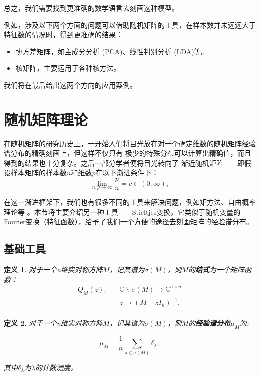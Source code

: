 \documentclass[UTF8,12pt]{ctexart}
\newtheorem{definition}{定义}
\begin{document}
总之，我们需要找到更准确的数学语言去刻画这种模型。

例如，涉及以下两个方面的问题可以借助随机矩阵的工具，在样本数并未远远大于特征数的情况时，得到更准确的结果：

\begin{itemize}
    \item 协方差矩阵，如主成分分析 (PCA)、线性判别分析 (LDA)等。
    \item 核矩阵，主要运用于各种核方法。
\end{itemize}
我们将在最后给出这两个方向的应用案例。

\section{随机矩阵理论}

在随机矩阵的研究历史上，一开始人们将目光放在对一个确定维数的随机矩阵经验谱分布的精确刻画上，但这样不仅只有
极少的特殊分布可以计算出精确值，而且得到的结果也十分复杂\cite{Wishart1928THEGP}。之后一部分学者便将目光转向了
渐近随机矩阵——即假设样本矩阵的样本数$n$和维数$p$在以下渐进条件下：
\[
    \lim\limits_{n,p \rightarrow \infty}\frac{p}{n} = c \in (0,\infty),
\]  

在这一渐进框架下，我们也有很多不同的工具来解决问题，例如矩方法\cite{Wigner1955CharacteristicVO}、自由概率理论\cite{Voiculescu1992FreeRV}等
。本节将主要介绍另一种工具——Stieltjes变换，它类似于随机变量的Fourier变换（特征函数），给予了我们一个方便的途径去刻画矩阵的经验谱分布。
\subsection{基础工具}

\begin{definition}
    对于一个n维实对称方阵$M$，记其谱为$\sigma(M)$，则$M$的\textbf{结式}为一个矩阵函数：
    \begin{equation*}
        \begin{aligned}
            Q_M(z):  \quad & \mathbb C \backslash \sigma(M) \rightarrow \mathbb C^{n\times n} \\
                    & z \rightarrow {(M-zI_n)}^{-1}. \\
        \end{aligned}
    \end{equation*}
 
\end{definition}

\begin{definition}
    对于一个n维实对称方阵$M$，记其谱为$\sigma(M)$，则$M$的\textbf{经验谱分布}$\mu_M$为:

    \begin{equation*}
        \mu_M = \frac{1}{n}\sum\limits_{\lambda \in \sigma(M)} \delta_{\lambda},
    \end{equation*}
 
    其中$\delta_{\lambda}$为$\lambda$的计数测度。
\end{definition}
\end{document}
